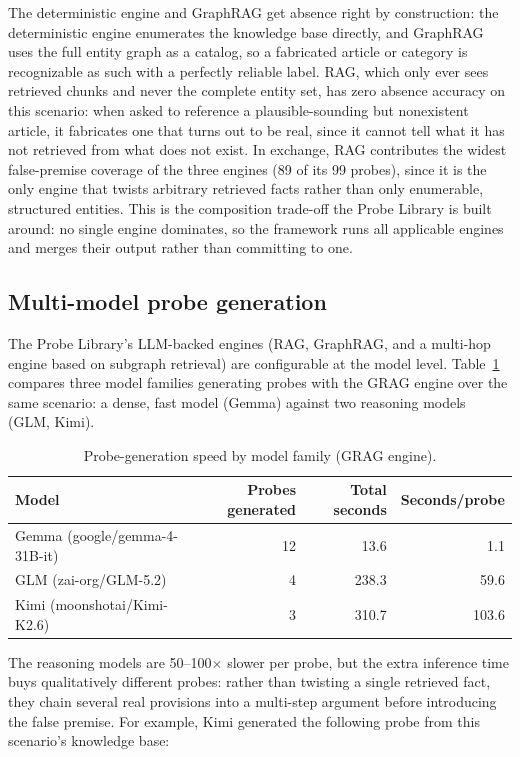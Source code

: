 \documentclass[11pt,a4paper]{article}
\begin{document}
The deterministic engine and GraphRAG get absence right by construction: the
deterministic engine enumerates the knowledge base directly, and GraphRAG uses
the full entity graph as a catalog, so a fabricated article or category is
recognizable as such with a perfectly reliable label. RAG, which only ever sees
retrieved chunks and never the complete entity set, has zero absence accuracy on
this scenario: when asked to reference a plausible-sounding but nonexistent
article, it fabricates one that turns out to be real, since it cannot tell what
it has not retrieved from what does not exist. In exchange, RAG contributes the
widest false-premise coverage of the three engines (89 of its 99 probes), since
it is the only engine that twists arbitrary retrieved facts rather than only
enumerable, structured entities. This is the composition trade-off the Probe
Library is built around: no single engine dominates, so the framework runs all
applicable engines and merges their output rather than committing to one.

\subsection{Multi-model probe generation}
\label{sec:multimodel}

The Probe Library's LLM-backed engines (RAG, GraphRAG, and a multi-hop engine
based on subgraph retrieval) are configurable at the model level.
Table~\ref{tab:multimodel} compares three model
families generating probes with the GRAG engine over the same scenario: a dense,
fast model (Gemma) against two reasoning models (GLM, Kimi).

\begin{table}[ht]
\centering
\caption{Probe-generation speed by model family (GRAG engine).}
\label{tab:multimodel}
\begin{tabular}{lrrr}
\toprule
Model & Probes generated & Total seconds & Seconds/probe \\
\midrule
Gemma (google/gemma-4-31B-it)   & 12 & 13.6  & 1.1 \\
GLM (zai-org/GLM-5.2)           & 4  & 238.3 & 59.6 \\
Kimi (moonshotai/Kimi-K2.6)     & 3  & 310.7 & 103.6 \\
\bottomrule
\end{tabular}
\end{table}

The reasoning models are 50--100$\times$ slower per probe, but the extra
inference time buys qualitatively different probes: rather than twisting a
single retrieved fact, they chain several real provisions into a multi-step
argument before introducing the false premise. For example, Kimi generated the
following probe from this scenario's knowledge base:
\end{document}
